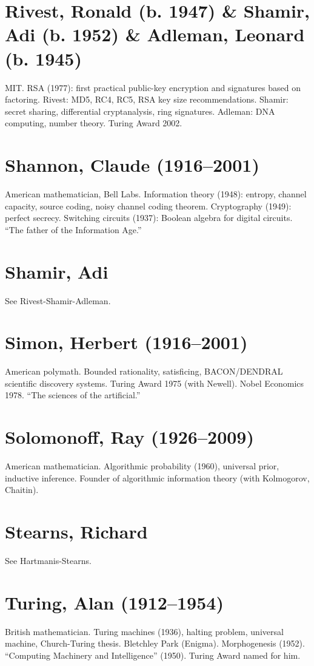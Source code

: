 \section*{Rivest, Ronald (b. 1947) \& Shamir, Adi (b. 1952) \& Adleman, Leonard (b. 1945)}
MIT. RSA (1977): first practical public-key encryption and signatures based on factoring. Rivest: MD5, RC4, RC5, RSA key size recommendations. Shamir: secret sharing, differential cryptanalysis, ring signatures. Adleman: DNA computing, number theory. Turing Award 2002.

\section*{Shannon, Claude (1916--2001)}
American mathematician, Bell Labs. Information theory (1948): entropy, channel capacity, source coding, noisy channel coding theorem. Cryptography (1949): perfect secrecy. Switching circuits (1937): Boolean algebra for digital circuits. ``The father of the Information Age.''

\section*{Shamir, Adi}
See Rivest-Shamir-Adleman.

\section*{Simon, Herbert (1916--2001)}
American polymath. Bounded rationality, satisficing, BACON/DENDRAL scientific discovery systems. Turing Award 1975 (with Newell). Nobel Economics 1978. ``The sciences of the artificial.''

\section*{Solomonoff, Ray (1926--2009)}
American mathematician. Algorithmic probability (1960), universal prior, inductive inference. Founder of algorithmic information theory (with Kolmogorov, Chaitin).

\section*{Stearns, Richard}
See Hartmanis-Stearns.

\section*{Turing, Alan (1912--1954)}
British mathematician. Turing machines (1936), halting problem, universal machine, Church-Turing thesis. Bletchley Park (Enigma). Morphogenesis (1952). ``Computing Machinery and Intelligence'' (1950). Turing Award named for him.

